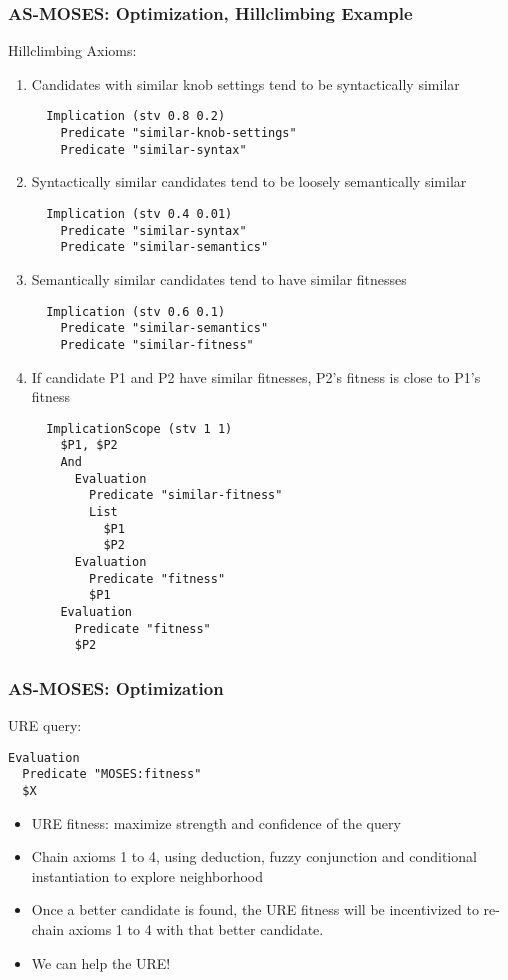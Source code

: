 \documentclass{beamer}
\begin{document}
\begin{frame}[fragile]
  \frametitle{AS-MOSES: Optimization, Hillclimbing Example}

{\tiny Hillclimbing Axioms:
\begin{enumerate}
  \item Candidates with \alert{similar knob settings} tend to be
    \alert{syntactically similar}
\begin{verbatim}
  Implication (stv 0.8 0.2)
    Predicate "similar-knob-settings"
    Predicate "similar-syntax"
\end{verbatim}
  \item \alert{Syntactically similar} candidates tend to be loosely
    \alert{semantically similar}
\begin{verbatim}
  Implication (stv 0.4 0.01)
    Predicate "similar-syntax"
    Predicate "similar-semantics"
\end{verbatim}
  \item \alert{Semantically similar} candidates tend to have
    \alert{similar fitnesses}
\begin{verbatim}
  Implication (stv 0.6 0.1)
    Predicate "similar-semantics"
    Predicate "similar-fitness"
\end{verbatim}
  \item If candidate P1 and P2 have \alert{similar fitnesses},
    \alert{P2's fitness is close to P1's fitness}
\begin{verbatim}
  ImplicationScope (stv 1 1)
    $P1, $P2
    And
      Evaluation
        Predicate "similar-fitness"
        List
          $P1
          $P2
      Evaluation
        Predicate "fitness"
        $P1
    Evaluation
      Predicate "fitness"
      $P2
\end{verbatim}
  \end{enumerate}}

\end{frame}

\begin{frame}[fragile]
  \frametitle{AS-MOSES: Optimization}
{\small
  URE query:

\begin{verbatim}
Evaluation
  Predicate "MOSES:fitness"
  $X
\end{verbatim}

\begin{itemize}
\item URE fitness: \alert{maximize strength and confidence} of the
  query
\item Chain axioms 1 to 4, using deduction, fuzzy conjunction and
  conditional instantiation to explore neighborhood
\item Once a better candidate is found, the URE fitness will be
  incentivized to re-chain axioms 1 to 4 with that better candidate.
\item We can help the URE!
\end{itemize}
}

\end{frame}
\end{document}
